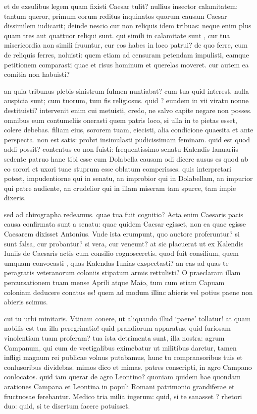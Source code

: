  et de exsulibus legem quam fixisti Caesar tulit? nullius insector calamitatem: tantum queror, primum eorum reditus inquinatos quorum causam Caesar dissimilem iudicarit; deinde nescio cur non reliquis idem tribuas: neque enim plus quam tres aut quattuor reliqui sunt. qui simili in calamitate sunt , cur tua misericordia non simili fruuntur, cur eos habes in loco patrui? de quo ferre, cum de reliquis ferres, noluisti: quem etiam ad censuram petendam impulisti, eamque petitionem comparasti quae et risus hominum et querelas moveret. cur autem ea comitia non habuisti?

 an quia tribunus plebis sinistrum fulmen nuntiabat? cum tua quid interest, nulla auspicia sunt; cum tuorum, tum fis religiosus. quid ? eundem in vii viratu nonne destituisti? intervenit enim cui metuisti, credo, ne salvo capite negare non posses. omnibus eum contumeliis onerasti quem patris loco, si ulla in te pietas esset, colere debebas. filiam eius, sororem tuam, eiecisti, alia condicione quaesita et ante perspecta. non est satis: probri insimulasti pudicissimam feminam. quid est quod addi possit? contentus eo non fuisti: frequentissimo senatu Kalendis Ianuariis sedente patruo hanc tibi esse cum Dolabella causam odi dicere ausus es quod ab eo sorori et uxori tuae stuprum esse oblatum comperisses. quis interpretari potest, impudentiorne qui in senatu, an improbior qui in Dolabellam, an impurior qui patre audiente, an crudelior qui in illam miseram tam spurce, tam impie dixeris.

 sed ad chirographa redeamus. quae tua fuit cognitio? Acta enim Caesaris pacis causa confirmata sunt a senatu: quae quidem Caesar egisset, non ea quae egisse Caesarem dixisset Antonius. Vnde ista erumpunt, quo auctore proferuntur? si sunt falsa, cur probantur? si vera, cur veneunt? at sic placuerat ut ex Kalendis Iuniis de Caesaris actis cum consilio cognosceretis. quod fuit consilium, quem umquam convocasti , quas Kalendas Iunias exspectasti? an eas ad quas te peragratis veteranorum coloniis stipatum armis rettulisti? O praeclaram illam percursationem tuam mense Aprili atque Maio, tum cum etiam Capuam coloniam deducere conatus es! quem ad modum illinc abieris vel potius paene non abieris scimus.

 cui tu urbi minitaris. Vtinam conere, ut aliquando illud `paene' tollatur! at quam nobilis est tua illa peregrinatio! quid prandiorum apparatus, quid furiosam vinolentiam tuam proferam? tua ista detrimenta sunt, illa nostra: agrum Campanum, qui cum de vectigalibus eximebatur ut militibus daretur, tamen infligi magnum rei publicae volnus putabamus, hunc tu compransoribus tuis et conlusoribus dividebas. mimos dico et mimas, patres conscripti, in agro Campano conlocatos. quid iam querar de agro Leontino? quoniam quidem hae quondam arationes Campana et Leontina in populi Romani patrimonio grandiferae et fructuosae ferebantur. Medico tria milia iugerum: quid, si te sanasset ? rhetori duo: quid, si te disertum facere potuisset.


